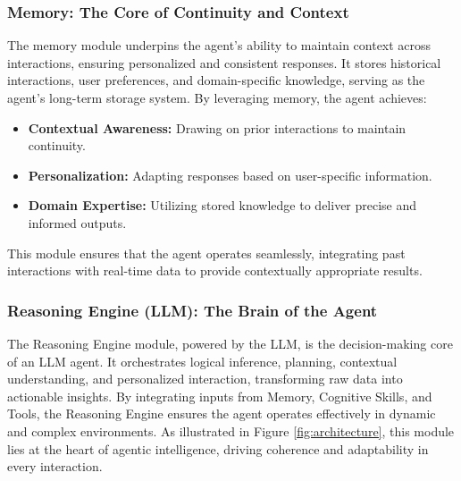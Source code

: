 \documentclass[12pt]{article}
\begin{document}
\subsubsection{Memory: The Core of Continuity and Context}
The memory module underpins the agent’s ability to maintain context across interactions, ensuring personalized and consistent responses. It stores historical interactions, user preferences, and domain-specific knowledge, serving as the agent’s long-term storage system. By leveraging memory, the agent achieves:
\begin{itemize}
    \item \textbf{Contextual Awareness:} Drawing on prior interactions to maintain continuity.
    \item \textbf{Personalization:} Adapting responses based on user-specific information.
    \item \textbf{Domain Expertise:} Utilizing stored knowledge to deliver precise and informed outputs.
\end{itemize}
This module ensures that the agent operates seamlessly, integrating past interactions with real-time data to provide contextually appropriate results.

\subsubsection{Reasoning Engine (LLM): The Brain of the Agent}
The Reasoning Engine module, powered by the LLM, is the decision-making core of an LLM agent. It orchestrates logical inference, planning, contextual understanding, and personalized interaction, transforming raw data into actionable insights. By integrating inputs from Memory, Cognitive Skills, and Tools, the Reasoning Engine ensures the agent operates effectively in dynamic and complex environments. As illustrated in Figure \ref{fig:architecture}, this module lies at the heart of agentic intelligence, driving coherence and adaptability in every interaction.
\end{document}
